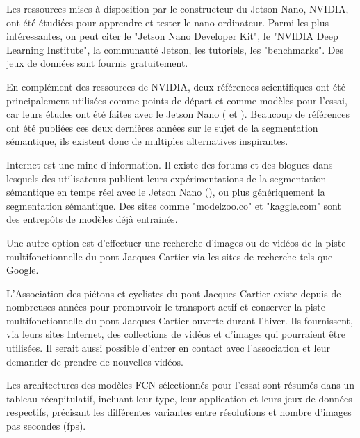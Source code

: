 ﻿\par Les ressources mises à disposition par le constructeur du Jetson Nano, NVIDIA, ont été étudiées pour apprendre et tester le nano ordinateur. Parmi les plus intéressantes, on peut citer le "Jetson Nano Developer Kit", le "NVIDIA Deep Learning Institute", la communauté Jetson, les tutoriels, les "benchmarks". Des jeux de données sont fournis gratuitement.
\par En complément des ressources de NVIDIA, deux références scientifiques ont été principalement utilisées comme points de départ et comme modèles pour l'essai, car leurs études ont été faites avec le Jetson Nano (\cite{nguyen_mavnet_2019} et \cite{chong_real-time_1992}). Beaucoup de références ont été publiées ces deux dernières années sur le sujet de la segmentation sémantique, ils existent donc de multiples alternatives inspirantes.
\par Internet est une mine d'information. Il existe des forums et des blogues dans lesquels des utilisateurs publient leurs expérimentations de la segmentation sémantique en temps réel avec le Jetson Nano (\cite{dustin_realtime_2019}), ou plus génériquement la segmentation sémantique. Des sites comme "modelzoo.co" et "kaggle.com" sont des entrepôts de modèles déjà entrainés. 
\par Une autre option est d'effectuer une recherche d'images ou de vidéos de la piste multifonctionnelle du pont Jacques-Cartier via les sites de recherche tels que Google. 
\par L'Association des piétons et cyclistes du pont Jacques-Cartier existe depuis de nombreuses années pour promouvoir le transport actif et conserver la piste multifonctionnelle du pont Jacques Cartier ouverte durant l'hiver. Ils fournissent, via leurs sites Internet, des collections de vidéos et d'images qui pourraient être utilisées. Il serait aussi possible d'entrer en contact avec l'association et leur demander de prendre de nouvelles vidéos. \cite{association_des_pietons_et_cyclistes_du_pont_jacques-cartier_pontjacques-cartier365com_2020} \cite{association_des_pietons_et_cyclistes_pont_jacques-cartier_flickr_2020}
\par Les architectures des modèles FCN sélectionnés pour l'essai sont résumés dans un tableau récapitulatif, incluant leur type, leur application et leurs jeux de données respectifs, précisant les différentes variantes entre résolutions et nombre d'images pas secondes (\acrshort{fps}).